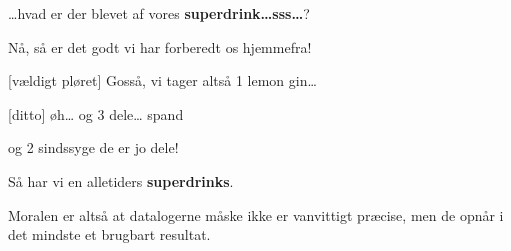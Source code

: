 \documentclass[a4paper,11pt]{article}
\newcommand{\sd}{\textbf{superdrinks}}
\begin{document}
\begin{sketch}
   \ldots{}hvad er der blevet af vores
  \textbf{superdrink\ldots{}sss\ldots}?
  
    Nå, så er det godt vi har forberedt os
  hjemmefra!
  
  
  [vældigt pløret] Gosså, vi tager altså 1 lemon gin\ldots
  
  [ditto] øh\ldots{} og 3 dele\ldots{} spand
  
   og 2 sindssyge de er jo dele!
  
   Så har vi en alletiders \sd. 
  
  
   Moralen er altså at datalogerne måske ikke er vanvittigt
  præcise, men de opnår i det mindste et brugbart resultat.
  







  
  

    
    
    
    
    
  
         
  
  

\end{sketch}
\end{document}
